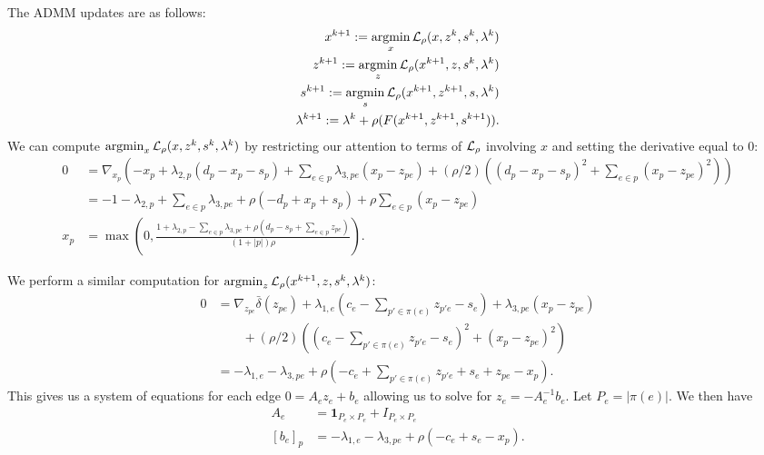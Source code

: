 \documentclass[11pt]{article}
\begin{document}
The ADMM updates are as follows:
\begin{equation}
    \begin{aligned}
        x^{k+1} := \operatorname*{argmin}_{x} \mathcal{L}_\rho(x,z^k,s^{k},\lambda^k)\\
        z^{k+1} := \operatorname*{argmin}_{z} \mathcal{L}_\rho(x^{k+1},z,s^{k},\lambda^k)\\
        s^{k+1} := \operatorname*{argmin}_{s} \mathcal{L}_\rho(x^{k+1},z^{k+1},s,\lambda^k)\\
        \lambda^{k+1} := \lambda^k + \rho(F(x^{k+1},z^{k+1},s^{k+1})).
    \end{aligned}
\end{equation}
We can compute $\operatorname*{argmin}_{x} \mathcal{L}_\rho(x,z^k,s^k,\lambda^k)$ by restricting our
attention to terms of $\mathcal{L}_\rho$ involving $x$ and setting the derivative equal to 0:
\begin{align*}
0
&= \nabla_{x_p}(-x_p + \lambda_{2,p}(d_p - x_p - s_p) + \sum_{e\in p}\lambda_{3,pe}(x_p - z_{pe})
+ (\rho/2)((d_p - x_p - s_p)^2 + \sum_{e \in p}(x_p - z_{pe})^2))\\
&= -1 -\lambda_{2,p} + \sum_{e \in p}\lambda_{3,pe} + \rho(-d_p + x_p + s_p)
    +\rho\sum_{e \in p} (x_p - z_{pe})\\
x_p &= \max(0,\frac{1 + \lambda_{2,p} - \sum_{e \in p}\lambda_{3,pe}
    + \rho(d_p - s_p + \sum_{e\in p} z_{pe})}
{(1+|p|)\rho}).
\end{align*}

We perform a similar computation for $\operatorname*{argmin}_{z} \mathcal{L}_\rho(x^{k+1},z,s^k,\lambda^k)$:
\begin{align*}
0
&= \nabla_{z_{pe}}\bar\delta(z_{pe}) + \lambda_{1,e}(c_e - \sum_{p'\in\pi(e)} z_{p'e} - s_{e})
    + \lambda_{3,pe}(x_p - z_{pe})\\
& \qquad + (\rho/2)((c_e - \sum_{p'\in\pi(e)} z_{p'e} - s_e)^2 + (x_p - z_{pe})^2)\\
&= -\lambda_{1,e} - \lambda_{3,pe}
    + \rho(-c_e + \sum_{p'\in\pi(e)} z_{p'e} + s_e  + z_{pe} - x_p).
\end{align*}
This gives us a system of equations for each edge $0 = A_ez_e + b_e$
allowing us to solve for $z_e = -A_e^{-1}b_e$.
Let $P_e= |\pi(e)|$. We then have
\begin{align*}
A_e &= \mathbf{1}_{P_e\times P_e} + I_{P_e\times P_e}\\
[b_e]_p &= -\lambda_{1,e} - \lambda_{3,pe}
    + \rho(-c_e + s_e - x_p).
\end{align*}
\end{document}
